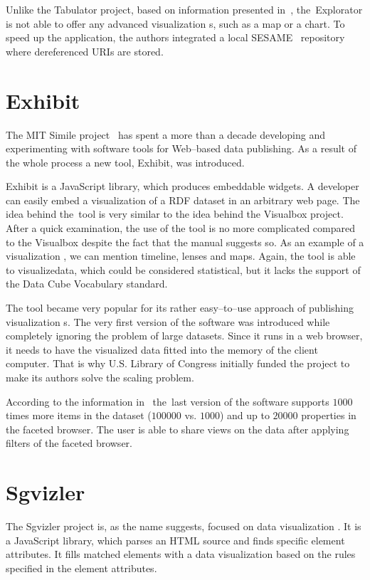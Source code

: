 Unlike the Tabulator project, based on information presented in~\cite{explorator},
the~Explorator is not able to offer any advanced visualization s, such as a map or 
a chart. To speed up the application, the authors integrated a local SESAME~\cite{sesame} 
repository where dereferenced URIs are stored.

\section{Exhibit}
The MIT Simile project~\cite{mit-simile} has spent a more than a decade
developing and experimenting with software tools for Web--based data publishing.
As a result of the whole process a new tool, Exhibit, was introduced.

Exhibit is a JavaScript library, which produces embeddable widgets. A developer can
easily embed a visualization of a RDF dataset in an arbitrary web page. The idea behind 
the~tool is very similar to the idea behind the Visualbox project. After a quick 
examination, the use of the tool is no more complicated compared to the 
Visualbox despite the fact that the manual suggests so. As an example of a 
visualization , we can mention timeline, lenses and maps. Again, the tool is able 
to visualizedata, which could be considered statistical, but it lacks the 
support of the Data Cube Vocabulary standard.

The tool became very popular for its rather easy--to--use 
approach of publishing visualization s. The very first version of the software
was introduced while completely ignoring the problem of large datasets.
Since it runs in a web browser, it needs to have the visualized data
fitted into the memory of the client 
computer. That is why U.S. Library of Congress initially funded the project to 
make its authors solve the scaling problem.

According to the information in~\cite{exhibit}
the~last version of the software supports $1000$ times more items in the
dataset ($100 000$ vs. $1000$) and up to $20 000$ properties in the faceted browser. 
The user is able to share views on the data after applying filters of the 
faceted browser. 

\section{Sgvizler}
The Sgvizler project is, as the name suggests, focused on data visualization . 
It is a JavaScript library, which parses an HTML source and finds specific 
element attributes. It fills matched elements with a data visualization based on 
the rules specified in the element attributes.

